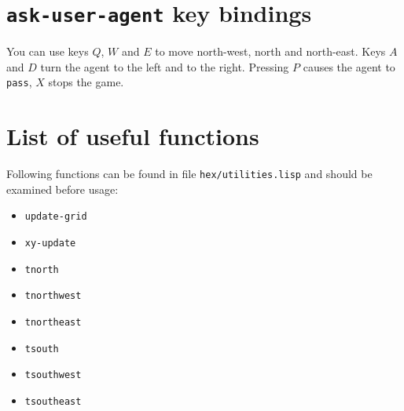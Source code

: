 \documentclass[a4paper,12pt]{article}
\begin{document}
\section*{\texttt{ask-user-agent} key bindings}
You can use keys $Q$, $W$ and $E$ to move north-west, north and north-east. Keys $A$ and $D$ turn
the agent to the left and to the right. Pressing $P$ causes the agent to \texttt{pass}, $X$ stops the game.

\section*{List of useful functions}
Following functions can be found in file \texttt{hex/utilities.lisp} and should be examined before usage:
\begin{itemize}
\item \texttt{update-grid}
\item \texttt{xy-update}
\item \texttt{tnorth}
\item \texttt{tnorthwest}
\item \texttt{tnortheast}
\item \texttt{tsouth}
\item \texttt{tsouthwest}
\item \texttt{tsoutheast}
\end{itemize}
\end{document}

